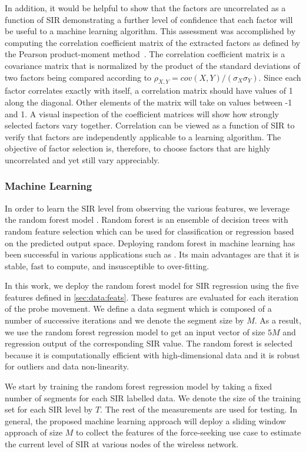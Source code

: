 In addition, it would be helpful to show that the factors are uncorrelated as a function of SIR demonstrating a further level of confidence that each factor will be useful to a machine learning algorithm.  This assessment was accomplished by computing the correlation coefficient matrix of the extracted factors as defined by the Pearson product-moment method~\cite{Yeager}.  The correlation coefficient matrix is a covariance matrix that is normalized by the product of the standard deviations of two factors being compared according to $\rho_{X,Y} = cov(X,Y)/(\sigma_{X}\sigma_{Y})$.	Since each factor correlates exactly with itself, a correlation matrix should have values of 1 along the diagonal.  Other elements of the matrix will take on values between -1 and 1.  A visual inspection of the coefficient matrices will show how strongly selected factors vary together.  Correlation can be viewed as a function of SIR to verify that factors are independently applicable to a learning algorithm.  The objective of factor selection is, therefore, to choose factors that are highly uncorrelated and yet still vary appreciably\cite{LeeRodgers1988}.

\subsubsection{Machine Learning}\label{ftml-conf:sec:data:ML}
In order to learn the SIR level from observing the various features, we leverage the random forest model \cite{RF}. Random forest is an ensemble of decision trees with random feature selection which can be used for classification or regression based on the predicted output space. Deploying random forest in machine learning has been successful in various applications such as \cite{RF_1,RF_2,RF_3}. Its main advantages are that it is stable, fast to compute, and insusceptible to over-fitting.

In this work, we deploy the random forest model for SIR regression using the five features defined in \ref{sec:data:feats}. These features are evaluated for each iteration of the probe movement. We define a data segment which is composed of a number of successive iterations and we denote the segment size by $M$. As a result, we use the random forest regression model to get an input vector of size $5M$ and regression output of the corresponding SIR value. The random forest is selected because it is computationally efficient with high-dimensional data and it is robust for outliers and data non-linearity. 

We start by training the random forest regression model by taking a fixed number of segments for each SIR labelled data. We denote the size of the training set for each SIR level by $T$. The rest of the measurements are used for testing. In general, the proposed machine learning approach will deploy a sliding window approach of size $M$ to collect the features of the force-seeking use case to estimate the current level of SIR at various nodes of the wireless network. 

